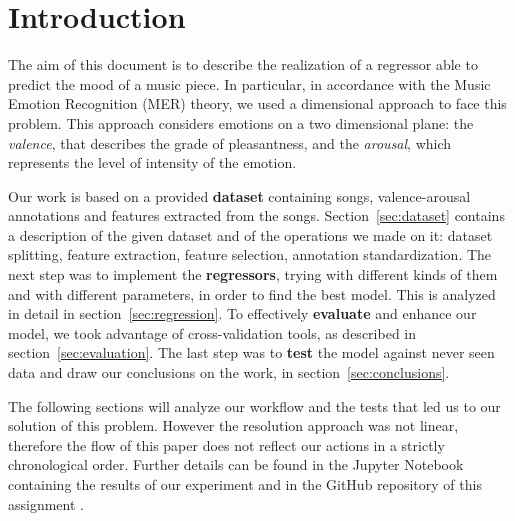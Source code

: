 \section{Introduction}

The aim of this document is to describe the realization of a regressor able to predict the mood of a music piece. In particular, in accordance with the Music Emotion Recognition (MER) theory, we used a dimensional approach to face this problem. This approach considers emotions on a two dimensional plane: the \emph{valence}, that describes the grade of pleasantness, and the \emph{arousal}, which represents the level of intensity of the emotion.

Our work is based on a provided \textbf{dataset} containing songs, valence-arousal annotations and features extracted from the songs. Section~\ref{sec:dataset} contains a description of the given dataset and of the operations we made on it: dataset splitting, feature extraction, feature selection, annotation standardization.
The next step was to implement the \textbf{regressors}, trying with different kinds of them and with different parameters, in order to find the best model. This is analyzed in detail in section~\ref{sec:regression}.
To effectively \textbf{evaluate} and enhance our model, we took advantage of cross-validation tools, as described in section~\ref{sec:evaluation}.
The last step was to \textbf{test} the model against never seen data and draw our conclusions on the work, in section~\ref{sec:conclusions}.

The following sections will analyze our workflow and the tests that led us to our solution of this problem. However the resolution approach was not linear, therefore the flow of this paper does not reflect our actions in a strictly chronological order. Further details can be found in the Jupyter Notebook containing the results of our experiment \cite{notebook} and in the GitHub repository of this assignment \cite{github}.


